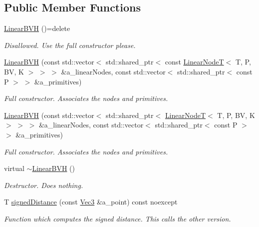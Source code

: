 \subsection*{Public Member Functions}
\begin{DoxyCompactItemize}
\item 
\mbox{\label{classBVH_1_1LinearBVH_af071dcad6741be1314c0b39512d2f142}} 
\hyperlink{classBVH_1_1LinearBVH_af071dcad6741be1314c0b39512d2f142}{Linear\+B\+VH} ()=delete
\begin{DoxyCompactList}\small\item\em Disallowed. Use the full constructor please. \end{DoxyCompactList}\item 
\hyperlink{classBVH_1_1LinearBVH_a34fcf759d0b39c9d83aca039cd0b18a8}{Linear\+B\+VH} (const std\+::vector$<$ std\+::shared\+\_\+ptr$<$ const \hyperlink{classBVH_1_1LinearNodeT}{Linear\+NodeT}$<$ T, P, BV, K $>$ $>$ $>$ \&a\+\_\+linear\+Nodes, const std\+::vector$<$ std\+::shared\+\_\+ptr$<$ const P $>$ $>$ \&a\+\_\+primitives)
\begin{DoxyCompactList}\small\item\em Full constructor. Associates the nodes and primitives. \end{DoxyCompactList}\item 
\hyperlink{classBVH_1_1LinearBVH_a413ba6da95c3839b90c4a3441aa5395b}{Linear\+B\+VH} (const std\+::vector$<$ std\+::shared\+\_\+ptr$<$ \hyperlink{classBVH_1_1LinearNodeT}{Linear\+NodeT}$<$ T, P, BV, K $>$ $>$ $>$ \&a\+\_\+linear\+Nodes, const std\+::vector$<$ std\+::shared\+\_\+ptr$<$ const P $>$ $>$ \&a\+\_\+primitives)
\begin{DoxyCompactList}\small\item\em Full constructor. Associates the nodes and primitives. \end{DoxyCompactList}\item 
\mbox{\label{classBVH_1_1LinearBVH_a39a98014b81061b35604422cfab5c9b7}} 
virtual \hyperlink{classBVH_1_1LinearBVH_a39a98014b81061b35604422cfab5c9b7}{$\sim$\+Linear\+B\+VH} ()
\begin{DoxyCompactList}\small\item\em Destructor. Does nothing. \end{DoxyCompactList}\item 
T \hyperlink{classBVH_1_1LinearBVH_a8fb0c0cb9e8f5161ed78953237eb3c39}{signed\+Distance} (const \hyperlink{classBVH_1_1LinearBVH_a13b0083e8b7ff1a5e170d39d69e6a15a}{Vec3} \&a\+\_\+point) const noexcept
\begin{DoxyCompactList}\small\item\em Function which computes the signed distance. This calls the other version. \end{DoxyCompactList}\end{DoxyCompactItemize}
